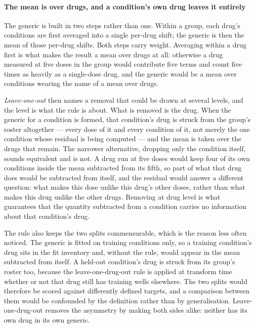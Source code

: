\paragraph{The mean is over drugs, and a condition's own drug leaves it entirely}
The generic is built in two steps rather than one. Within a group, each drug's
conditions are first averaged into a single per-drug shift; the generic is then the
mean of those per-drug shifts. Both steps carry weight. Averaging within a drug
first is what makes the result a mean over drugs at all: otherwise a drug measured
at five doses in the group would contribute five terms and count five times as
heavily as a single-dose drug, and the generic would be a mean over conditions
wearing the name of a mean over drugs.

\emph{Leave-one-out} then names a removal that could be drawn at several levels,
and the level is what the rule is about. What is removed is the drug. When the
generic for a condition is formed, that condition's drug is struck from the group's
roster altogether --- every dose of it and every condition of it, not merely the one
condition whose residual is being computed --- and the mean is taken over the drugs
that remain. The narrower alternative, dropping only the condition itself, sounds
equivalent and is not. A drug run at five doses would keep four of its own
conditions inside the mean subtracted from its fifth, so part of what that drug does
would be subtracted from itself, and the residual would answer a different question:
what makes this dose unlike this drug's other doses, rather than what makes this
drug unlike the other drugs. Removing at drug level is what guarantees that the
quantity subtracted from a condition carries no information about that condition's
drug.

The rule also keeps the two splits commensurable, which is the reason less often
noticed. The generic is fitted on training conditions only, so a training
condition's drug sits in the fit inventory and, without the rule, would appear in
the mean subtracted from itself. A held-out condition's drug is struck from its group's roster too, because the leave-one-drug-out rule is applied at transform time whether or not that drug still has training wells elsewhere. The two splits would therefore be scored against
differently defined targets, and a comparison between them would be confounded by
the definition rather than by generalisation. Leave-one-drug-out removes the
asymmetry by making both sides alike: neither has its own drug in its own generic.

